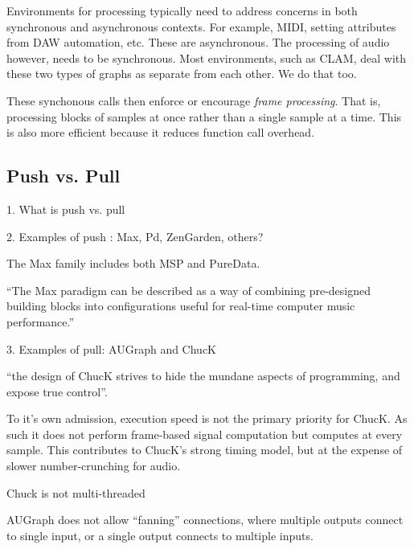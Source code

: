 \documentclass[twoside,a4paper]{article}
\begin{document}

Environments for processing typically need to address concerns in both synchronous and asynchronous contexts.  For example, MIDI, setting attributes from DAW automation, etc.  These are asynchronous.  The processing of audio however, needs to be synchronous.  Most environments, such as CLAM, deal with these two types of graphs as separate from each other.  We do that too.

These synchonous calls then enforce or encourage \emph{frame processing}.  That is, processing blocks of samples at once rather than a single sample at a time.  This is also more efficient because it reduces function call overhead.



\subsection{Push vs. Pull} %

1. What is push vs. pull

2. Examples of push : Max, Pd, ZenGarden, others? 

The Max family includes both MSP\cite{Zicarelli:1998} and PureData\cite{Puckette:1996}.

``The Max paradigm can be described as a way of combining pre-designed building blocks into configurations useful for real-time computer music performance.''\cite{Puckette:2002_max_at_17}


3. Examples of pull: AUGraph and ChucK


``the design of ChucK strives to hide the mundane aspects of programming, and expose true control''\cite{wang:2008}.

To it's own admission, execution speed is not the primary priority for ChucK.  As such it does not perform frame-based signal computation but computes at every sample.  This contributes to ChucK's strong timing model, but at the expense of slower number-crunching for audio.


Chuck is not multi-threaded

AUGraph does not allow ``fanning'' connections, where multiple outputs connect to single input, or a single output connects to multiple inputs.
\end{document}
